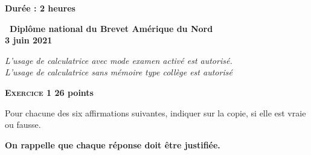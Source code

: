 \documentclass[11pt]{article}
\begin{document}
\pagestyle{fancy}
\thispagestyle{empty}

\begin{center}\textbf{Durée : 2 heures}

\vspace{0,5cm}

{\Large\textbf{\decofourleft~Diplôme national du Brevet
Amérique du Nord~\decofourright}}\\[6pt]
{\Large \textbf{3 juin 2021}}


\medskip

\emph{L'usage de calculatrice avec mode examen activé est autorisé.\\
L'usage de calculatrice sans mémoire \og type collège \fg{} est autorisé}

\end{center}

\vspace{0,5cm}

\textbf{{\large \textsc{Exercice 1}} \hfill 26 points}

Pour chacune des six affirmations suivantes, indiquer sur la copie, si elle est vraie ou fausse.

\medskip

\textbf{On rappelle que chaque réponse doit être justifiée.}
\end{document}
